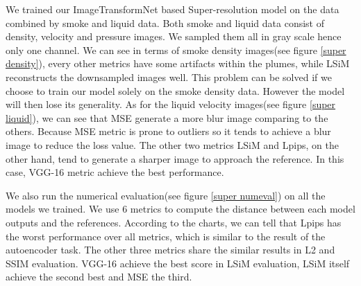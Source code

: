 \documentclass[a4paper,12pt,twoside]{report}
\begin{document}
We trained our ImageTransformNet based Super-resolution model on the data combined by smoke and liquid data. Both smoke and liquid data consist of density, velocity and pressure images. We sampled them all in gray scale hence only one channel.
We can see in terms of smoke density images(see figure \ref{super density}), every other metrics have some artifacts within the plumes, while LSiM reconstructs the downsampled images well. This problem can be solved if we choose to train our model solely on the smoke density data. However the model will then lose its generality.
As for the liquid velocity images(see figure \ref{super liquid}), we can see that MSE generate a more blur image comparing to the others. Because MSE metric is prone to outliers so it tends to achieve a blur image to reduce the loss value. The other two metrics LSiM and Lpips, on the other hand, tend to generate a sharper image to approach the reference. In this case, VGG-16 metric achieve the best performance.

We also run the numerical evaluation(see figure \ref{super numeval}) on all the models we trained. We use 6 metrics to compute the distance between each model outputs and the references. According to the charts, we can tell that Lpips has the worst performance over all metrics, which is similar to the result of the autoencoder task. The other three metrics share the similar results in L2 and SSIM evaluation. VGG-16 achieve the best score in LSiM evaluation, LSiM itself achieve the second best and MSE the third.
\end{document}
